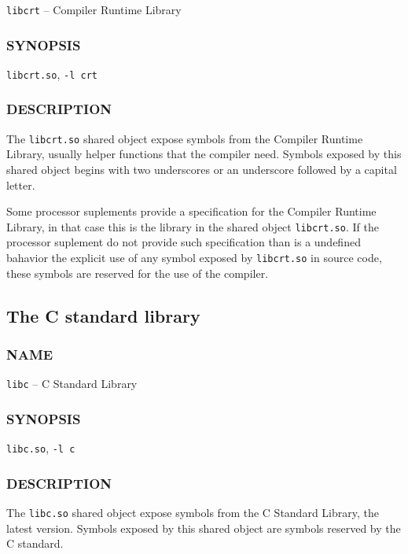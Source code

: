 \noindent
\texttt{libcrt} -- Compiler Runtime Library

\subsubsection*{SYNOPSIS}

\noindent
\texttt{libcrt.so}, \texttt{-l crt}

\subsubsection*{DESCRIPTION}

The \texttt{libcrt.so} shared object
expose symbols from the Compiler Runtime Library,
usually helper functions that the compiler need.
Symbols exposed by this shared object
begins with two underscores or an underscore followed by a capital letter.

Some processor suplements provide a specification for the
Compiler Runtime Library, in that case this is the library in the shared
object \texttt{libcrt.so}.
If the processor suplement do not provide such specification than
is a undefined bahavior the explicit use of
any symbol exposed by \texttt{libcrt.so} in source code,
these symbols are reserved for the use of the compiler.


\subsection{The C standard library}

\subsubsection*{NAME}

\noindent
\texttt{libc} -- C Standard Library

\subsubsection*{SYNOPSIS}

\noindent
\texttt{libc.so}, \texttt{-l c}

\subsubsection*{DESCRIPTION}

The \texttt{libc.so} shared object
expose symbols from the C Standard Library, the latest version\cite{ISO9899}.
Symbols exposed by this shared object are symbols reserved by the C standard.

